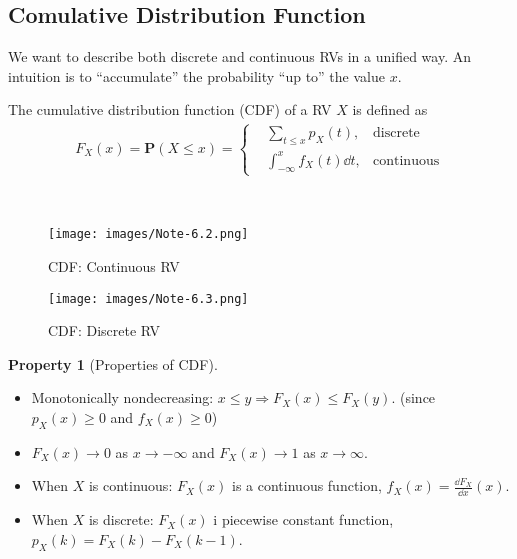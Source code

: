 \documentclass[device=normal, lang=en, fontsize=12pt]{elegantnote}
\numberwithin{equation}{section}
\theoremstyle{definition} %
\newtheorem{property}{Property}[section] %
\begin{document}
\subsection{Comulative Distribution Function}
We want to describe both discrete and continuous RVs in a unified way. An intuition is to ``accumulate'' the probability ``up to'' the value $x$.
\begin{definition}[CDF]
    The cumulative distribution function (CDF) of a RV $X$ is defined as
    \begin{align}
        F_{X}(x) = \mathbf{P}(X \leq x) = \left\{
        \begin{aligned}
            &\sum_{t \leq x} p_{X}(t), &\text{discrete} \\ 
            &\int_{-\infty}^{x} f_{X}(t) \dd{t}, &\text{continuous}
        \end{aligned}
        \right.
    \end{align}
\end{definition}
\begin{example} ~
    \begin{figure}[H]
        \centering
        \texttt{[image: images/Note-6.2.png]}
        \caption{CDF: Continuous RV}
    \end{figure}
    \begin{figure}[H]
        \centering
        \texttt{[image: images/Note-6.3.png]}
        \caption{CDF: Discrete RV}
    \end{figure}
\end{example}
\begin{property}[Properties of CDF] ~
    \begin{itemize}
        \item Monotonically nondecreasing: $x \leq y \Rightarrow F_{X}(x) \leq F_{X}(y)$. (since $p_{X}(x) \geq 0$ and $f_{X}(x) \geq 0$)
        \item $F_X(x) \to 0$ as $x \to -\infty$ and $F_X(x) \to 1$ as $x \to \infty$.
        \item When $X$ is continuous: $F_{X}(x)$ is a continuous function, $f_{X}(x) = \frac{\dd{F_{X}}}{\dd{x}}(x)$.
        \item When $X$ is discrete: $F_{X}(x)$ i piecewise constant function, $p_{X}(k) = F_{X}(k) - F_{X}(k-1)$.
    \end{itemize}
\end{property}
\end{document}
